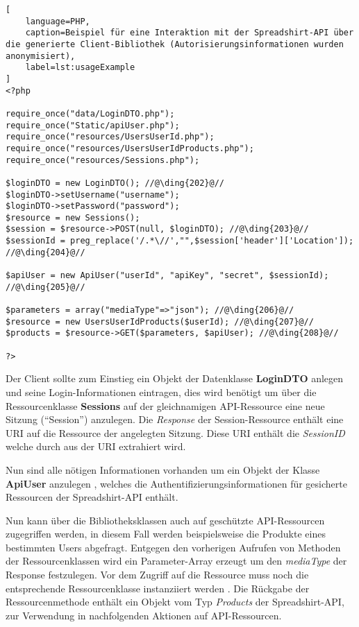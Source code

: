 \begin{minipage}{\textwidth}
\begin{lstlisting}[
    language=PHP,
    caption=Beispiel für eine Interaktion mit der Spreadshirt-API über die generierte Client-Bibliothek (Autorisierungsinformationen wurden anonymisiert),
    label=lst:usageExample
]
<?php

require_once("data/LoginDTO.php");
require_once("Static/apiUser.php");
require_once("resources/UsersUserId.php");
require_once("resources/UsersUserIdProducts.php");
require_once("resources/Sessions.php");

$loginDTO = new LoginDTO(); //@\ding{202}@//
$loginDTO->setUsername("username");
$loginDTO->setPassword("password");
$resource = new Sessions();
$session = $resource->POST(null, $loginDTO); //@\ding{203}@//
$sessionId = preg_replace('/.*\//',"",$session['header']['Location']); //@\ding{204}@//

$apiUser = new ApiUser("userId", "apiKey", "secret", $sessionId); //@\ding{205}@//

$parameters = array("mediaType"=>"json"); //@\ding{206}@//
$resource = new UsersUserIdProducts($userId); //@\ding{207}@//
$products = $resource->GET($parameters, $apiUser); //@\ding{208}@//

?>
\end{lstlisting}
\end{minipage}

Der Client sollte zum Einstieg ein Objekt der Datenklasse \textbf{LoginDTO} anlegen  und seine Login-Informationen eintragen, dies wird benötigt um über die Ressourcenklasse \textbf{Sessions} auf der gleichnamigen \gls{API}-Ressource eine neue Sitzung (\enquote{Session}) anzulegen.
Die \emph{Response} der Session-Ressource enthält eine \gls{URI} auf die Ressource der angelegten Sitzung. Diese \gls{URI} enthält die \emph{SessionID} welche durch  aus der \gls{URI} extrahiert wird.

Nun sind alle nötigen Informationen vorhanden um ein Objekt der Klasse \textbf{ApiUser} anzulegen , welches die Authentifizierungsinformationen für gesicherte Ressourcen der Spreadshirt-\gls{API} enthält.

Nun kann über die Bibliotheksklassen auch auf geschützte \gls{API}-Ressourcen zugegriffen werden, in diesem Fall werden beispielsweise die Produkte eines bestimmten Users abgefragt. Entgegen den vorherigen Aufrufen von Methoden der Ressourcenklassen wird ein Parameter-Array erzeugt  um den \emph{mediaType} der Response festzulegen.
Vor dem Zugriff auf die Ressource muss noch die entsprechende Ressourcenklasse instanziiert werden . Die Rückgabe der Ressourcenmethode enthält ein Objekt vom Typ \emph{Products} der Spreadshirt-\gls{API}, zur Verwendung in nachfolgenden Aktionen auf \gls{API}-Ressourcen.

